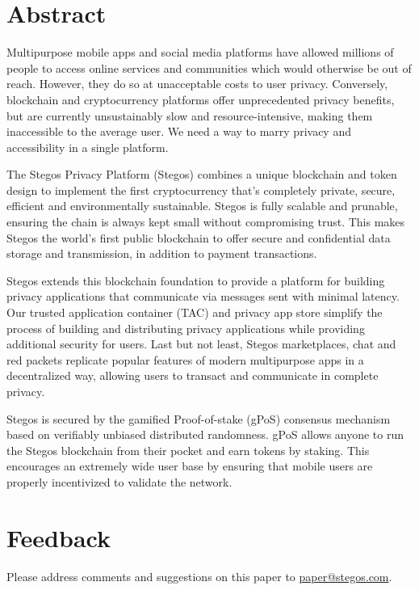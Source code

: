 \documentclass[8pt,fleqn,openany]{book}
\begin{document}
\newpage

\tableofcontents\newpage

\section{Abstract}
Multipurpose mobile apps and social media platforms have allowed millions of people to access online services and communities which would otherwise be out of reach. However, they do so at unacceptable costs to user privacy. Conversely, blockchain and cryptocurrency platforms offer unprecedented privacy benefits, but are currently unsustainably slow and resource-intensive, making them inaccessible to the average user. We need a way to marry privacy and accessibility in a single platform.

The Stegos Privacy Platform (Stegos) combines a unique blockchain and token design to implement the first cryptocurrency that’s completely private, secure, efficient and environmentally sustainable. Stegos is fully scalable and prunable, ensuring the chain is always kept small without compromising trust. This makes Stegos the world’s first public blockchain to offer secure and confidential data storage and transmission, in addition to payment transactions. 

Stegos extends this blockchain foundation to provide a platform for building privacy applications that communicate via messages sent with minimal latency. Our trusted application container (TAC) and privacy app store simplify the process of building and distributing privacy applications while providing additional security for users. Last but not least, Stegos marketplaces, chat and red packets replicate popular features of modern multipurpose apps in a decentralized way, allowing users to transact and communicate in complete privacy.

Stegos is secured by the gamified Proof-of-stake (gPoS) consensus mechanism based on verifiably unbiased distributed randomness. gPoS allows anyone to run the Stegos blockchain from their pocket and earn tokens by staking. This encourages an extremely wide user base by ensuring that mobile users are properly incentivized to validate the network.
\section{Feedback}

Please address comments and suggestions on this paper to \href{mailto:paper@stegos.com}{paper@stegos.com}.
\end{document}
